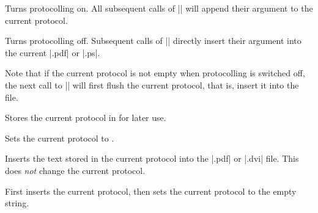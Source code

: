 \begin{command}{\pgfsysprotocol@bufferedtrue}
  Turns protocolling on. All subsequent calls of
  |\pgfsysprotocol@literal| will append their argument to the current
  protocol. 
\end{command}

\begin{command}{\pgfsysprotocol@bufferedfalse}
  Turns protocolling off. Subsequent calls of
  |\pgfsysprotocol@literal| directly insert their argument into the
  current |.pdf| or |.ps|.

  Note that if the current protocol is not empty when protocolling is
  switched off, the next call to |\pgfsysprotocol@literal| will first
  flush the current protocol, that is, insert it into the file.
\end{command}

\begin{command}{\pgfsysprotocol@getcurrentprotocol{}}
  Stores the current protocol in  for later use.
\end{command}

\begin{command}{\pgfsysprotocol@setcurrentprotocol{}}
  Sets the current protocol to .
\end{command}

\begin{command}{\pgfsysprotocol@invokecurrentprotocol}
  Inserts the text stored in the current protocol into the |.pdf| or
  |.dvi| file. This does \emph{not} change the current protocol.
\end{command}

\begin{command}{\pgfsysprotocol@flushcurrentprotocol}
  First inserts the current protocol, then sets the current protocol
  to the empty string.
\end{command}

